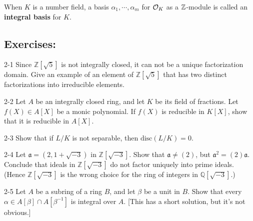 \documentclass[12pt]{amsart}
\begin{document}
\begin{definition}
    When $K$ is a number field, a basis $\alpha_1, \cdots, \alpha_m$ for $\mathcal{O}_K$ as a $\mathbb Z$-module is called an \textbf{integral basis} for $K$.    
\end{definition}

\begin{remark}
\end{remark}

\subsection{Exercises:}\bbni

\begin{exercise}{2-1}
Since $\mathbb{Z}[\sqrt{5}]$ is not integrally closed, it can not be a unique factorization domain. Give an example of an element of $\mathbb{Z}[\sqrt{5}]$ that has two distinct factorizations into irreducible elements.
\end{exercise}

\begin{exercise}{2-2}
Let $A$ be an integrally closed ring, and let $K$ be its field of fractions. Let $f(X)\in A[X]$ be a monic polynomial. If $f(X)$ is reducible in $K[X]$, show that it is reducible in $A[X]$.
\end{exercise}

\begin{exercise}{2-3}
Show that if $L/K$ is not separable, then $\mathrm{disc}(L/K)=0$.
\end{exercise}

\begin{exercise}{2-4}
Let $\mathfrak{a}=(2,1+\sqrt{-3})$ in $\mathbb{Z}[\sqrt{-3}]$. Show that $\mathfrak{a}\neq (2)$, but $\mathfrak{a}^2=(2)\mathfrak{a}$. Conclude that ideals in $\mathbb{Z}[\sqrt{-3}]$ do not factor uniquely into prime ideals. (Hence $\mathbb{Z}[\sqrt{-3}]$ is the wrong choice for the ring of integers in $\mathbb{Q}[\sqrt{-3}]$.)
\end{exercise}

\begin{exercise}{2-5}
Let $A$ be a subring of a ring $B$, and let $\beta$ be a unit in $B$. Show that every $\alpha\in A[\beta]\cap A[\beta^{-1}]$ is integral over $A$. [This has a short solution, but it’s not obvious.]
\end{exercise}
\end{document}

